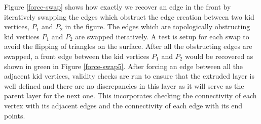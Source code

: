 Figure \ref{force-swap} shows how exactly we recover an edge in the front by iteratively swapping the edges which obstruct the edge creation between two kid vertices, $P_1$ and $P_2$ in the figure. The edges which are topologically obstructing kid vertices $P_1$ and $P_2$ are swapped iteratively. A test is setup for each swap to avoid the flipping of triangles on the surface. After all the obstructing edges are swapped, a front edge between the kid vertices $P_1$ and $P_2$ would be recovered as shown in green in Figure \ref{force-swap5}. After forcing an edge between all the adjacent kid vertices, validity checks are run to ensure that the extruded layer is well defined and there are no discrepancies in this layer as it will serve as the parent layer for the next one. This incorporates checking the connectivity of each vertex with its adjacent edges and the connectivity of each edge with its end points. 